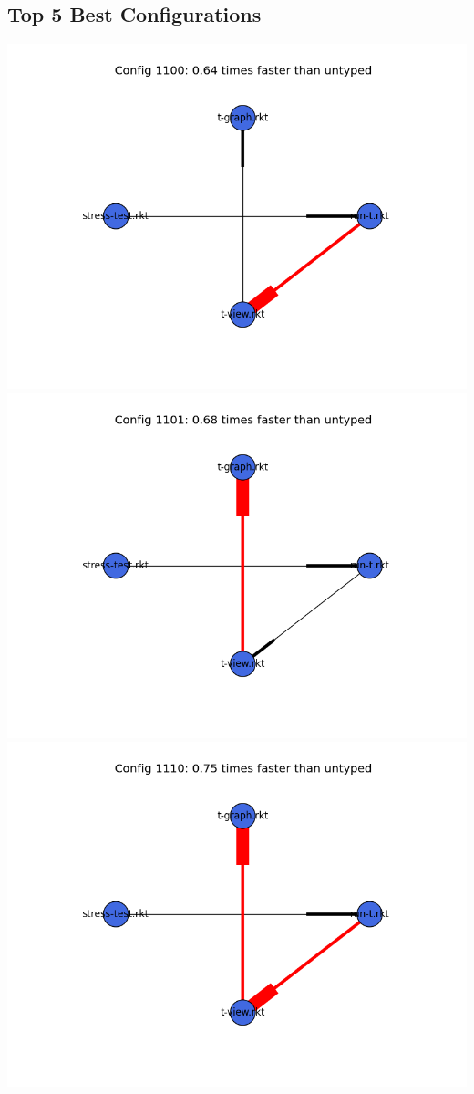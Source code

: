\documentclass{article}
\begin{document}
\begin{itemize}
\subsection{Top 5 Best Configurations}
\includegraphics[width=\textwidth]{mbta-2015-03-26-module-graph-1100.png}
\includegraphics[width=\textwidth]{mbta-2015-03-26-module-graph-1101.png}
\includegraphics[width=\textwidth]{mbta-2015-03-26-module-graph-1110.png}

\end{itemize}
\end{document}
